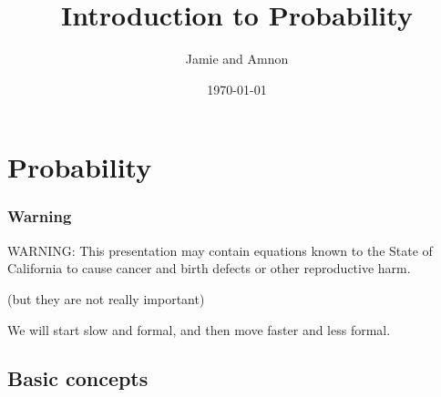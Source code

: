 \documentclass{beamer}
\title[Introduction to Probability]{Introduction to Probability} %
\author{Jamie and Amnon} %
\date{\today} %
\begin{document}
\begin{frame}
\titlepage %
\end{frame}



\section{Probability} %

\begin{frame}
\frametitle{Warning}
\begin{block}{}
WARNING: This presentation may contain equations known to the State of California to cause cancer and birth defects or other reproductive harm.
\end{block}

(but they are not really important)


We will start slow and formal, and then move faster and less formal.
\end{frame}


\subsection{Basic concepts} %
\end{document}
